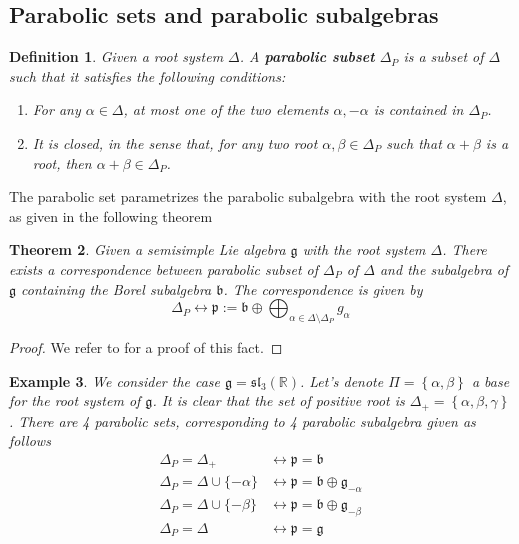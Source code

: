 \documentclass[12pt]{article} %
\newtheorem{definition}{Definition}[section]
\newtheorem{theorem}[definition]{Theorem}
\newtheorem{example}[definition]{Example}
\begin{document}
\subsection{Parabolic sets and parabolic subalgebras}
\begin{definition}
    Given a root system $\Delta$. A \textbf{parabolic subset} $\Delta_P$ is a subset of $\Delta$ such that
    it satisfies the following conditions:
    \begin{enumerate}
        \item For any $\alpha \in \Delta$, at most one of the two elements $\alpha, - \alpha$ is contained in $\Delta_P$.
        \item It is closed, in the sense that, for any two root $\alpha,\beta \in \Delta_P$ such that $\alpha+\beta$ is a root, then $\alpha+\beta \in \Delta_P$.
    \end{enumerate}
\end{definition}
The parabolic set parametrizes the parabolic subalgebra with the root system $\Delta$, as given in the following theorem
\begin{theorem}
    Given a semisimple Lie algebra $\mathfrak{g}$ with the root system $\Delta$. There exists a correspondence between
    parabolic subset of $\Delta_P$ of $\Delta$ and the subalgebra of $\mathfrak{g}$ containing the
    Borel subalgebra $\mathfrak{b}$. The correspondence is given by
    \[ \Delta_P \longleftrightarrow \mathfrak{p}:= \mathfrak{b}\oplus \bigoplus_{\alpha \in \Delta \setminus \Delta_P} g_{\alpha}\]
\end{theorem}
\begin{proof}
    We refer to \cite{} for a proof of this fact.
\end{proof}
\begin{example}
    We consider the case $\mathfrak{g} = \mathfrak{sl}_3(\mathbb{R})$. Let's denote
    $\Pi = \left\lbrace \alpha,\beta\right\rbrace$ a base for the root system of $\mathfrak{g}$. It is clear that
    the set of positive root is $\Delta_+=\left\lbrace \alpha,\beta,\gamma \right\rbrace$. There are
    4 parabolic sets, corresponding to 4 parabolic subalgebra given as follows
    \begin{align*}
        \Delta_P = \Delta_+                 & \longleftrightarrow \mathfrak{p} = \mathfrak{b}                               \\
        \Delta_{P} =\Delta \cup \{-\alpha\} & \longleftrightarrow \mathfrak{p} = \mathfrak{b} \oplus \mathfrak{g}_{-\alpha} \\
        \Delta_{P}= \Delta \cup \{-\beta\}  & \longleftrightarrow \mathfrak{p} = \mathfrak{b} \oplus \mathfrak{g}_{-\beta}  \\
        \Delta_P= \Delta                    & \longleftrightarrow \mathfrak{p} = \mathfrak{g}
    \end{align*}
\end{example}
\end{document}
